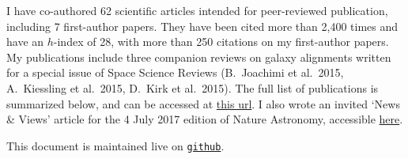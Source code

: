 I have co-authored 62 scientific articles intended for peer-reviewed publication,
including 7 first-author papers. They have been cited more than 2,400 times and
have an $h$-index of 28, with more than 250 citations on my first-author papers.
My publications include three companion reviews on galaxy alignments written for a
special issue of Space Science Reviews (B.\ Joachimi et al.\ 2015, A.\ Kiessling
et al.\ 2015, D.\ Kirk et al.\ 2015). The full list of publications is summarized
below, and can be accessed at \href{https://goo.gl/LAu9G4}{this url}. I also wrote
an invited `News \& Views' article for the 4 July 2017 edition of Nature
Astronomy, accessible
\href{https://www.nature.com/articles/s41550-017-0181}{here}.

This document is maintained live on
\href{https://github.com/cristobal-sifon/cv/blob/master/Sifon_publications.pdf}{\texttt{github}}.

